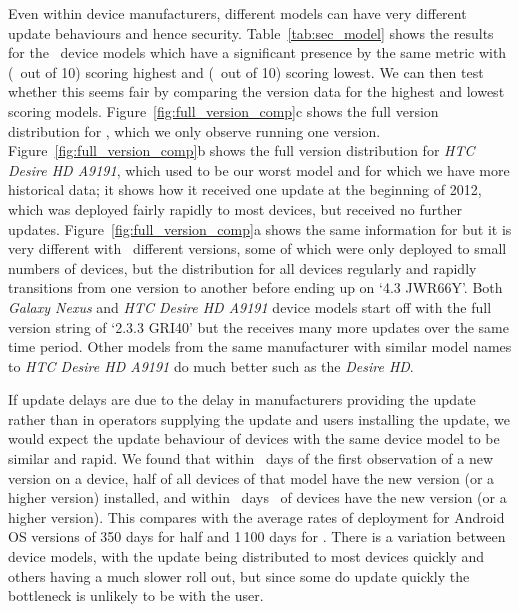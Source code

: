 \daTabSecScoresmodel
Even within device manufacturers, different models can have very different update behaviours and hence security.
Table~\ref{tab:sec_model} shows the results for the \daNumSigModels\ device models which have a significant presence by the same metric with \emph{\daSecScoreBestmodel} (\daSecScoreBestmodelScore\ out of 10) scoring highest and \emph{\daSecScoreWorstmodel} (\daSecScoreWorstmodelScore\ out of 10) scoring lowest.
We can then test whether this seems fair by comparing the version data for the highest and lowest scoring models.
Figure~\ref{fig:full_version_comp}c shows the full version distribution for \emph{\daSecScoreWorstmodel}, which we only observe running one version.
Figure~\ref{fig:full_version_comp}b shows the full version distribution for \emph{HTC Desire HD A9191}, which used to be our worst model and for which we have more historical data; it shows how it received one update at the beginning of 2012, which was deployed fairly rapidly to most devices, but received no further updates.
Figure~\ref{fig:full_version_comp}a shows the same information for \emph{\daSecScoreBestmodel} but it is very different with \daSecScoreBestmodelNumFullVersions\ different versions, some of which were only deployed to small numbers of devices, but the distribution for all devices regularly and rapidly transitions from one version to another before ending up on `4.3 JWR66Y'.
Both \emph{Galaxy Nexus} and \emph{HTC Desire HD A9191} device models start off with the full version string of `2.3.3 GRI40' but the \emph{\daSecScoreBestmodel} receives many more updates over the same time period.
Other models from the same manufacturer with similar model names to \emph{HTC Desire HD A9191} do much better such as the \emph{Desire HD}.

If update delays are due to the delay in manufacturers providing the update rather than in operators supplying the update and users installing the update, we would expect the update behaviour of devices with the same device model to be similar and rapid.
We found that within \daModelHalfDeployment\ days of the first observation of a new version on a device, half of all devices of that model have the new version (or a higher version) installed, and within \daModelFullDeployment\ days \daFullDeployedAt\ of devices have the new version (or a higher version).
This compares with the average rates of deployment for Android OS versions of 350 days for half and 1\,100 days for \daFullDeployedAt.
There is a variation between device models, with the update being distributed to most devices quickly and others having a much slower roll out, but since some do update quickly the bottleneck is unlikely to be with the user.

